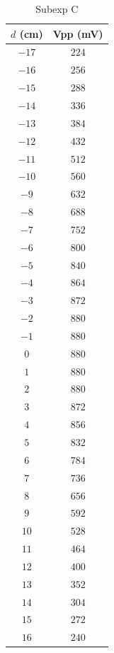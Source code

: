 \begin{table}[htb!]
\centering
\caption{Subexp C}
\begin{tabular}{cc}
\toprule
$d$ (\unit{\cm}) & Vpp (\unit{\mV}) \\
\midrule
$-17$ & $224$ \\
$-16$ & $256$ \\
$-15$ & $288$ \\
$-14$ & $336$ \\
$-13$ & $384$ \\
$-12$ & $432$ \\
$-11$ & $512$ \\
$-10$ & $560$ \\
$-9$ & $632$ \\
$-8$ & $688$ \\
$-7$ & $752$ \\
$-6$ & $800$ \\
$-5$ & $840$ \\
$-4$ & $864$ \\
$-3$ & $872$ \\
$-2$ & $880$ \\
$-1$ & $880$ \\
$0$ & $880$ \\
$1$ & $880$ \\
$2$ & $880$ \\
$3$ & $872$ \\
$4$ & $856$ \\
$5$ & $832$ \\
$6$ & $784$ \\
$7$ & $736$ \\
$8$ & $656$ \\
$9$ & $592$ \\
$10$ & $528$ \\
$11$ & $464$ \\
$12$ & $400$ \\
$13$ & $352$ \\
$14$ & $304$ \\
$15$ & $272$ \\
$16$ & $240$ \\
\bottomrule
\end{tabular}
\end{table}
